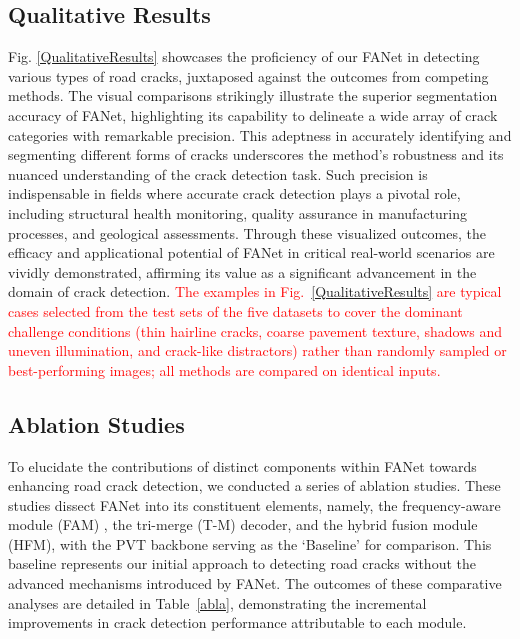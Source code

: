 \documentclass[journal]{IEEEtran}
\begin{document}
\subsection{Qualitative Results} \label{sec:Qualitative-Results}
Fig. \ref{QualitativeResults} showcases the proficiency of our FANet in detecting various types of road cracks, juxtaposed against the outcomes from competing methods. The visual comparisons strikingly illustrate the superior segmentation accuracy of FANet, highlighting its capability to delineate a wide array of crack categories with remarkable precision. This adeptness in accurately identifying and segmenting different forms of cracks underscores the method's robustness and its nuanced understanding of the crack detection task. Such precision is indispensable in fields where accurate crack detection plays a pivotal role, including structural health monitoring, quality assurance in manufacturing processes, and geological assessments. Through these visualized outcomes, the efficacy and applicational potential of FANet in critical real-world scenarios are vividly demonstrated, affirming its value as a significant advancement in the domain of crack detection.
\textcolor{red}{The examples in Fig.~\ref{QualitativeResults} are typical cases selected from the test sets of the five datasets to cover the dominant challenge conditions (thin hairline cracks, coarse pavement texture, shadows and uneven illumination, and crack-like distractors) rather than randomly sampled or best-performing images; all methods are compared on identical inputs.}


\subsection{Ablation Studies}
To elucidate the contributions of distinct components within FANet towards enhancing road crack detection, we conducted a series of ablation studies. These studies dissect FANet into its constituent elements, namely, the frequency-aware module (FAM) , the tri-merge (T-M) decoder, and the hybrid fusion module (HFM), with the PVT backbone serving as the `Baseline’ for comparison. This baseline represents our initial approach to detecting road cracks without the advanced mechanisms introduced by FANet. 
%
The outcomes of these comparative analyses are detailed in Table~\ref{abla}, demonstrating the incremental improvements in crack detection performance attributable to each module.
\end{document}
